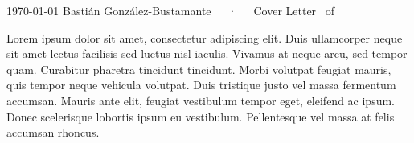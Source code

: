\documentclass[11pt, a4paper]{../bgonzalezbustamante-style}
\begin{document}
\makecvheader[L]

\makecvfooter
  {\today}
  {Bastián González-Bustamante~~~·~~~Cover Letter}
  {\thepage\ of \pageref*{LastPage}}

\makelettertitle




\begin{cvletter}

Lorem ipsum dolor sit amet, consectetur adipiscing elit. Duis ullamcorper neque sit amet lectus facilisis sed luctus nisl iaculis. Vivamus at neque arcu, sed tempor quam. Curabitur pharetra tincidunt tincidunt. Morbi volutpat feugiat mauris, quis tempor neque vehicula volutpat. Duis tristique justo vel massa fermentum accumsan. Mauris ante elit, feugiat vestibulum tempor eget, eleifend ac ipsum. Donec scelerisque lobortis ipsum eu vestibulum. Pellentesque vel massa at felis accumsan rhoncus.

\end{cvletter}

\makeletterclosing
\end{document}
